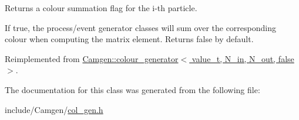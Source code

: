 Returns a colour summation flag for the i-\/th particle. 

If true, the process/event generator classes will sum over the corresponding colour when computing the matrix element. Returns false by default. 

Reimplemented from \hyperlink{a00078_ab7feac6ce81715acc83ac60b3d992129}{Camgen\+::colour\+\_\+generator$<$ value\+\_\+t, N\+\_\+in, N\+\_\+out, false $>$}.



The documentation for this class was generated from the following file\+:\begin{DoxyCompactItemize}
\item 
include/\+Camgen/\hyperlink{a00612}{col\+\_\+gen.\+h}\end{DoxyCompactItemize}
